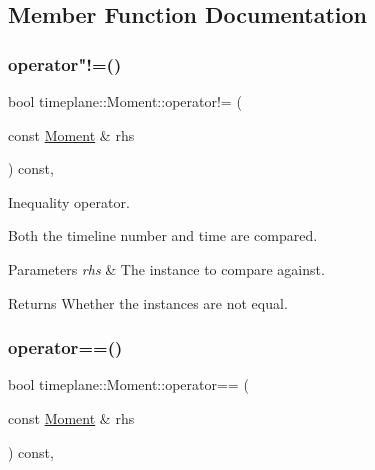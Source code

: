 \subsection{Member Function Documentation}
\mbox{\label{classtimeplane_1_1_moment_a2e50bd80270c77f8d1b9fdbc586efc7c}} 
\subsubsection{\texorpdfstring{operator"!=()}{operator!=()}}
{\footnotesize\ttfamily bool timeplane\+::\+Moment\+::operator!= (\begin{DoxyParamCaption}\item[{const \hyperlink{classtimeplane_1_1_moment}{Moment} \&}]{rhs }\end{DoxyParamCaption}) const\hspace{0.3cm}{\ttfamily [inline]}, {\ttfamily [noexcept]}}



Inequality operator. 

Both the timeline number and time are compared. 
\begin{DoxyParams}{Parameters}
{\em rhs} & The instance to compare against. \\
\hline
\end{DoxyParams}
\begin{DoxyReturn}{Returns}
Whether the instances are not equal. 
\end{DoxyReturn}
\mbox{\label{classtimeplane_1_1_moment_abe69bf9b6e324f3147c9f1ed078b9d0c}} 
\subsubsection{\texorpdfstring{operator==()}{operator==()}}
{\footnotesize\ttfamily bool timeplane\+::\+Moment\+::operator== (\begin{DoxyParamCaption}\item[{const \hyperlink{classtimeplane_1_1_moment}{Moment} \&}]{rhs }\end{DoxyParamCaption}) const\hspace{0.3cm}{\ttfamily [inline]}, {\ttfamily [noexcept]}}




